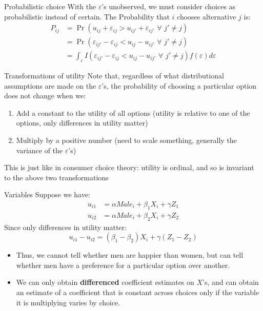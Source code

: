 \documentclass[english,aspectratio=169,12pt,xcolor=dvipsnames]{beamer}
\begin{document}
\begin{frame}{Probabilistic choice}
With the $\varepsilon$'s unobserved, we must consider choices as probabilistic instead of certain. The Probability that $i$ chooses alternative $j$ is:
\begin{align}
P_{ij}&=\Pr(u_{ij}+\varepsilon_{ij}>u_{ij'}+\varepsilon_{ij'}  \,\,\forall\,\,  j'\neq j)\\
&=\Pr(\varepsilon_{ij'}-\varepsilon_{ij}<u_{ij}-u_{ij'}  \,\,\forall\,\,  j'\neq j)\\
&=\int_{\varepsilon}I(\varepsilon_{ij'}-\varepsilon_{ij}<u_{ij}-u_{ij'}  \,\,\forall\,\,  j'\neq j)f(\varepsilon)d\varepsilon
\end{align}
\end{frame}



\begin{frame}{Transformations of utility}
Note that, regardless of what distributional assumptions are made on the $\varepsilon$'s, the probability of choosing a particular option does not change when we:
\begin{enumerate}
\item Add a constant to the utility of all options (utility is relative to one of the options, only differences in utility matter)
\item Multiply by a positive number (need to scale something, generally the variance of the $\varepsilon$'s)
\end{enumerate}
This is just like in consumer choice theory: utility is ordinal, and so is invariant to the above two transformations
\end{frame}



\begin{frame}{Variables}
Suppose we have:
\begin{align*}
u_{i1}&=\alpha Male_i+\beta_1 X_i + \gamma Z_1\\
u_{i2}&=\alpha Male_i+\beta_2 X_i+\gamma Z_2
\end{align*}
Since only differences in utility matter:
\begin{equation*}
u_{i1}-u_{i2}=(\beta_1-\beta_2)X_i+\gamma (Z_1-Z_2)
\end{equation*}
\begin{itemize}
\item Thus, we cannot tell whether men are happier than women, but can tell whether men have a preference for a particular option over another. 
\item We can only obtain \textbf{differenced} coefficient estimates on $X$'s, and can obtain an estimate of a coefficient that is constant across choices only if the variable it is multiplying varies by choice.
\end{itemize}
\end{frame}
\end{document}
